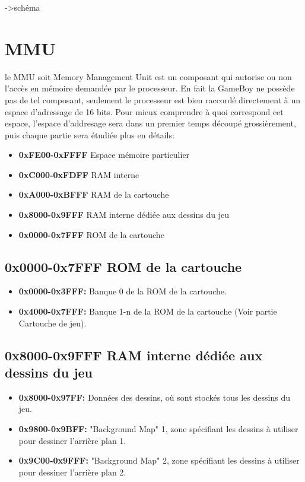 \documentclass{report}
\begin{document}
->schéma

\section{MMU}
le MMU soit Memory Management Unit est un composant qui autorise ou non l'accès en mémoire demandée par le processeur.
En fait la GameBoy ne possède pas de tel composant, seulement le processeur est bien raccordé directement à un espace d'adressage de 16 bits.
Pour mieux comprendre à quoi correspond cet espace, l'espace d'addresage sera
dans un premier temps découpé grossièrement, puis chaque partie sera étudiée
plus en détails:\\
\begin{itemize}
\item \textbf{0xFE00-0xFFFF} Espace mémoire particulier
\item \textbf{0xC000-0xFDFF} RAM interne
\item \textbf{0xA000-0xBFFF} RAM de la cartouche
\item \textbf{0x8000-0x9FFF} RAM interne dédiée aux dessins du jeu
\item \textbf{0x0000-0x7FFF} ROM de la cartouche
\end{itemize}

\subsection{0x0000-0x7FFF ROM de la cartouche}
\begin{itemize}
\item \textbf{0x0000-0x3FFF:} Banque 0 de la ROM de la cartouche.
\item \textbf{0x4000-0x7FFF:} Banque 1-n de la ROM de la cartouche (Voir partie Cartouche de jeu).
\end{itemize}

\subsection{0x8000-0x9FFF RAM interne dédiée aux dessins du jeu}
\begin{itemize}
\item \textbf{0x8000-0x97FF:} Données des dessins, où sont stockés tous les dessins du jeu.
\item \textbf{0x9800-0x9BFF:} "Background Map" 1, zone spécifiant les dessins à utiliser pour dessiner l'arrière plan 1.
\item \textbf{0x9C00-0x9FFF:} "Background Map" 2, zone spécifiant les dessins à utiliser pour dessiner l'arrière plan 2. 
\end{itemize} 
\end{document}
